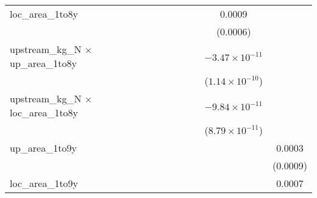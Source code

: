 \begin{tabular}{lcccccccc}
   loc\_area\_1to8y                               &                          &                          &                          &                          &                          &                          & 0.0009                   &   \\   
                                                  &                          &                          &                          &                          &                          &                          & (0.0006)                 &   \\   
   upstream\_kg\_N $\times$ up\_area\_1to8y       &                          &                          &                          &                          &                          &                          & $-3.47\times 10^{-11}$   &   \\   
                                                  &                          &                          &                          &                          &                          &                          & ($1.14\times 10^{-10}$)  &   \\   
   upstream\_kg\_N $\times$ loc\_area\_1to8y      &                          &                          &                          &                          &                          &                          & $-9.84\times 10^{-11}$   &   \\   
                                                  &                          &                          &                          &                          &                          &                          & ($8.79\times 10^{-11}$)  &   \\   
   up\_area\_1to9y                                &                          &                          &                          &                          &                          &                          &                          & 0.0003\\   
                                                  &                          &                          &                          &                          &                          &                          &                          & (0.0009)\\   
   loc\_area\_1to9y                               &                          &                          &                          &                          &                          &                          &                          & 0.0007\\   

\end{tabular}

